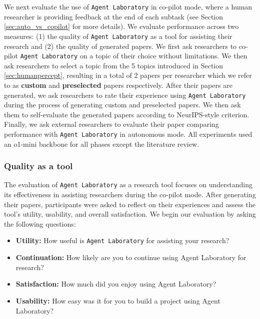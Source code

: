 \documentclass[11pt, a4paper]{gdm_format}
\begin{document}
We next evaluate the use of \texttt{Agent Laboratory} in co-pilot mode, where a human researcher is providing feedback at the end of each subtask (see Section \ref{sec:auto_vs_copilot} for more details). We evaluate performance across two measures: (1) the quality of \texttt{Agent Laboratory} as a tool for assisting their research and (2) the quality of generated papers. We first ask researchers to co-pilot \texttt{Agent Laboratory} on a topic of their choice without limitations. We then ask researchers to select a topic from the 5 topics introduced in Section \ref{sec:humanpercept}, resulting in a total of 2 papers per researcher which we refer to as \textbf{custom} and \textbf{preselected} papers respectively. After their papers are generated, we ask researchers to rate their experience using \texttt{Agent Laboratory} during the process of generating custom and preselected papers. We then ask them to self-evaluate the generated papers according to NeurIPS-style criterion. Finally, we ask external researchers to evaluate their paper comparing performance with \texttt{Agent Laboratory} in autonomous mode. All experiments used an o1-mini backbone for all phases except the literature review. 

\subsubsection{Quality as a tool}

The evaluation of \texttt{Agent Laboratory} as a research tool focuses on understanding its effectiveness in assisting researchers during the co-pilot mode. After generating their papers, participants were asked to reflect on their experiences and assess the tool's utility, usability, and overall satisfaction. We begin our evaluation by asking the following questions: 

\begin{itemize}
    \item \textbf{Utility:} How useful is \texttt{Agent Laboratory} for assisting your research?
    \item \textbf{Continuation:} How likely are you to continue using Agent Laboratory for research?
    \item \textbf{Satisfaction:} How much did you enjoy using Agent Laboratory?
    \item \textbf{Usability:} How easy was it for you to build a project using Agent Laboratory?
\end{itemize}
\end{document}

